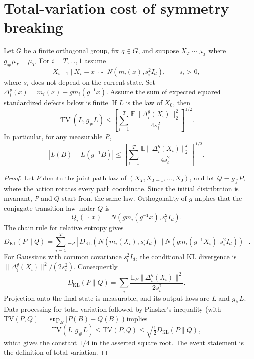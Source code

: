 
\section{Total-variation cost of symmetry breaking}
\label{app:tv-defect}

\begin{theorem}
\label{thm:th1-tv-proof}
Let \(G\) be a finite orthogonal group, fix \(g\in G\), and suppose
\(X_T\sim\mu_T\) where \(g_\#\mu_T=\mu_T\). For \(i=T,\ldots,1\) assume
\[
 X_{i-1}\mid X_i=x\ \sim\
 N(m_i(x),s_i^2 I_d),\qquad
 s_i>0,
\]
where \(s_i\) does not depend on the current state. Set
\(\Delta_i^g(x)=m_i(x)-g m_i(g^{-1}x)\).
Assume the sum of expected squared standardized defects below is
finite. If \(L\) is the law of \(X_0\), then
\[
 \operatorname{TV}(L,g_\#L)
 \le \left[
 \sum_{i=1}^{T}\frac{
 \mathbb E\|\Delta_i^g(X_i)\|_2^2}{4s_i^2}
 \right]^{1/2}.
\]
In particular, for any measurable \(B\),
\[
 |L(B)-L(g^{-1}B)|
 \le \left[
 \sum_{i=1}^{T}\frac{
 \mathbb E\|\Delta_i^g(X_i)\|_2^2}{4s_i^2}
 \right]^{1/2}.
\]
\end{theorem}

\begin{proof}
Let \(P\) denote the joint path law of
\((X_T,X_{T-1},\ldots,X_0)\), and let \(Q=g_\#P\),
where the action rotates every path coordinate. Since the initial
distribution is invariant, \(P\) and \(Q\) start from the same law.
Orthogonality of \(g\) implies that the conjugate transition law under
\(Q\) is
\[
 Q_i(\,\cdot\mid x)=N(g m_i(g^{-1}x),s_i^2 I_d).
\]
The chain rule for relative entropy gives
\[
 D_{\mathrm{KL}}(P\|Q)
 = \sum_{i=1}^{T}\mathbb E_P\left[
 D_{\mathrm{KL}}\left(
 N(m_i(X_i),s_i^2 I_d)\|
 N(gm_i(g^{-1}X_i),s_i^2 I_d)
 \right)\right].
\]
For Gaussians with common covariance \(s_i^2 I_d\), the conditional
KL divergence is
\(\|\Delta_i^g(X_i)\|^2/(2s_i^2)\). Consequently
\[
 D_{\mathrm{KL}}(P\|Q)
 =\sum_i\frac{\mathbb E_P\|\Delta_i^g(X_i)\|^2}{2s_i^2}.
\]
Projection onto the final state is measurable, and its output laws
are \(L\) and \(g_\#L\). Data processing for total variation followed
by Pinsker's inequality (with
\(\mathrm{TV}(P,Q)=\sup_B|P(B)-Q(B)|\)) implies
\[
 \mathrm{TV}(L,g_\#L)
 \le\mathrm{TV}(P,Q)
 \le\sqrt{\tfrac12D_{\mathrm{KL}}(P\|Q)},
\]
which gives the constant \(1/4\) in the asserted square root.
The event statement is the definition of total variation.
\end{proof}

